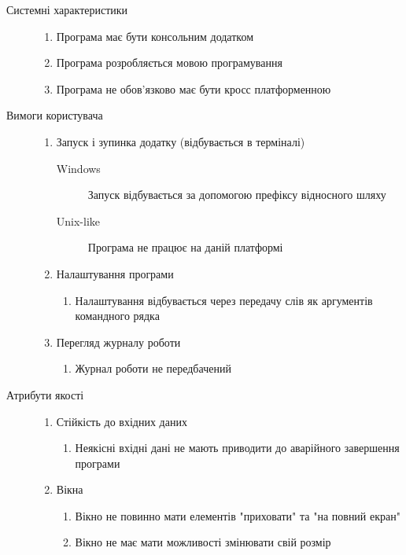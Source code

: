 \begin{description}
	\item[Системні характеристики]\directenv
		\begin{enumerate}
			\item Програма має бути консольним додатком
			\item Програма розробляється мовою програмування  
			\item Програма не обов'язково має бути кросс платформенною
		\end{enumerate}
	\item[Вимоги користувача]\directenv
		\begin{enumerate}
			\item Запуск і зупинка додатку (відбувається в терміналі)
				\begin{description}
					\item[Windows]
						Запуск відбувається за допомогою префіксу відносного шляху 
					\item[Unix-like]
						Програма не працює на даній платформі
				\end{description}
			\item Налаштування програми
				\begin{enumerate}
					\item Налаштування відбувається через передачу слів як аргументів командного рядка
				\end{enumerate}
			\item Перегляд журналу роботи
				\begin{enumerate}
					\item Журнал роботи не передбачений
				\end{enumerate}
		\end{enumerate}
	\item[Атрибути якості]\directenv
		\begin{enumerate}
			\item Стійкість до вхідних даних
				\begin{enumerate}
					\item Неякісні вхідні дані не мають приводити до аварійного завершення програми
				\end{enumerate}
			\item Вікна
				\begin{enumerate}
					\item Вікно не повинно мати елементів "приховати" та "на повний екран"
					\item Вікно не має мати можливості змінювати свій розмір

\end{enumerate}
\end{enumerate}
\end{description}
